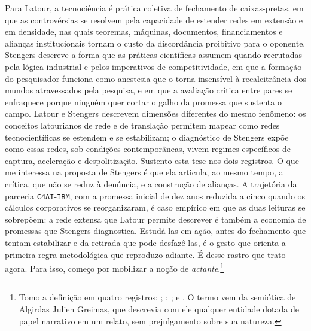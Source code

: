 Para Latour, a tecnociência é prática coletiva de fechamento de caixas-pretas, em que as controvérsias se resolvem pela capacidade de estender redes em extensão e em densidade, nas quais teoremas, máquinas, documentos, financiamentos e alianças institucionais tornam o custo da discordância proibitivo para o oponente. Stengers descreve a forma que as práticas científicas assumem quando recrutadas pela lógica industrial e pelos imperativos de competitividade, em que a formação do pesquisador funciona como anestesia que o torna insensível à recalcitrância dos mundos atravessados pela pesquisa, e em que a avaliação crítica entre pares se enfraquece porque ninguém quer cortar o galho da promessa que sustenta o campo. Latour e Stengers descrevem dimensões diferentes do mesmo fenômeno: os conceitos latourianos de rede e de translação permitem mapear como redes tecnocientíficas se estendem e se estabilizam; o diagnóstico de Stengers expõe como essas redes, sob condições contemporâneas, vivem regimes específicos de captura, aceleração e despolitização. Sustento esta tese nos dois registros. O que me interessa na proposta de Stengers é que ela articula, ao mesmo tempo, a crítica, que não se reduz à denúncia, e a construção de alianças. A trajetória da parceria \texttt{C4AI}-\texttt{IBM}, com a promessa inicial de dez anos reduzida a cinco quando os cálculos corporativos se reorganizaram, é caso empírico em que as duas leituras se sobrepõem: a rede extensa que Latour permite descrever é também a economia de promessas que Stengers diagnostica. Estudá-las em ação, antes do fechamento que tentam estabilizar e da retirada que pode desfazê-las, é o gesto que orienta a primeira regra metodológica que reproduzo adiante. É desse rastro que trato agora. Para isso, começo por mobilizar a noção de \textit{actante}.\footnote{Tomo a definição em quatro registros: \textcite[p. 127, 138-140]{Latour2011CienciaEmAcao}; \textcite[Glossário]{Latour2017Esperanca}; \textcite[Glossário]{latour2004politics}; e \textcite{johnson1988mixing}. O termo vem da semiótica de Algirdas Julien Greimas, que descrevia com ele qualquer entidade dotada de papel narrativo em um relato, sem prejulgamento sobre sua natureza.}

